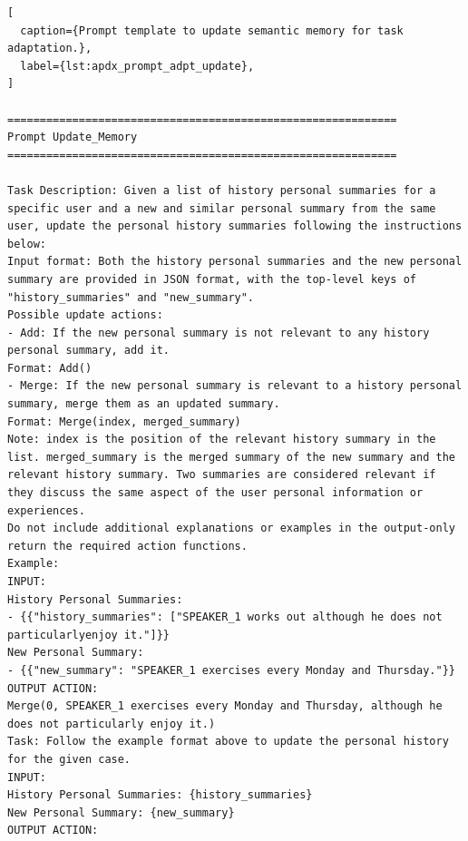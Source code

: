 \begin{lstlisting}[
  caption={Prompt template to update semantic memory for task adaptation.},
  label={lst:apdx_prompt_adpt_update},
]

============================================================
Prompt Update_Memory
============================================================

Task Description: Given a list of history personal summaries for a specific user and a new and similar personal summary from the same user, update the personal history summaries following the instructions below:
Input format: Both the history personal summaries and the new personal summary are provided in JSON format, with the top-level keys of "history_summaries" and "new_summary".
Possible update actions:
- Add: If the new personal summary is not relevant to any history personal summary, add it.
Format: Add()
- Merge: If the new personal summary is relevant to a history personal summary, merge them as an updated summary.
Format: Merge(index, merged_summary)
Note: index is the position of the relevant history summary in the list. merged_summary is the merged summary of the new summary and the relevant history summary. Two summaries are considered relevant if they discuss the same aspect of the user personal information or experiences.
Do not include additional explanations or examples in the output-only return the required action functions.
Example:
INPUT:
History Personal Summaries:
- {{"history_summaries": ["SPEAKER_1 works out although he does not particularlyenjoy it."]}}
New Personal Summary:
- {{"new_summary": "SPEAKER_1 exercises every Monday and Thursday."}}
OUTPUT ACTION:
Merge(0, SPEAKER_1 exercises every Monday and Thursday, although he does not particularly enjoy it.)
Task: Follow the example format above to update the personal history for the given case.
INPUT:
History Personal Summaries: {history_summaries}
New Personal Summary: {new_summary}
OUTPUT ACTION:

\end{lstlisting}